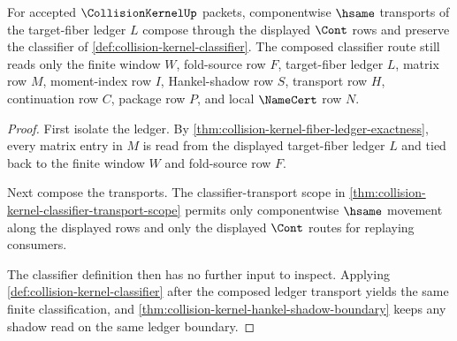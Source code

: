 \begin{theorem}
\label{thm:collision-kernel-fiber-classifier-composition}
For accepted $\CollisionKernelUp$ packets, componentwise $\hsame$ transports of the target-fiber ledger $L$ compose through the displayed $\Cont$ rows and preserve the classifier of \autoref{def:collision-kernel-classifier}. The composed classifier route still reads only the finite window $W$, fold-source row $F$, target-fiber ledger $L$, matrix row $M$, moment-index row $I$, Hankel-shadow row $S$, transport row $H$, continuation row $C$, package row $P$, and local $\NameCert$ row $N$.
\end{theorem}
\begin{proof}
First isolate the ledger. By \autoref{thm:collision-kernel-fiber-ledger-exactness}, every matrix entry in $M$ is read from the displayed target-fiber ledger $L$ and tied back to the finite window $W$ and fold-source row $F$.

Next compose the transports. The classifier-transport scope in \autoref{thm:collision-kernel-classifier-transport-scope} permits only componentwise $\hsame$ movement along the displayed rows and only the displayed $\Cont$ routes for replaying consumers.

The classifier definition then has no further input to inspect. Applying \autoref{def:collision-kernel-classifier} after the composed ledger transport yields the same finite classification, and \autoref{thm:collision-kernel-hankel-shadow-boundary} keeps any shadow read on the same ledger boundary.
\end{proof}

